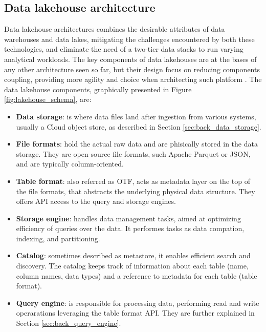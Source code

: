 \subsection{Data lakehouse architecture}
\label{subsec:datalakehouse_architecture}
Data lakehouse architectures combines the desirable attributes of data warehouses and data lakes, mitigating the challenges encountered by both these technologies, and eliminate the need of a two-tier data stacks to run varying analytical workloads. The key components of data lakehouses are at the bases of any other architecture seen so far, but their design focus on reducing components coupling, providing more agility and choice when architecting such platform \cite{mazumdarDataLakehouseData2023}. The data lakehouse components, graphically presented in Figure \ref{fig:lakehouse_schema}, are:

\begin{itemize}
    \item \textbf{Data storage}: is where data files land after ingestion from various systems, usually a Cloud object store, as described in Section \ref{sec:back_data_storage}.
    \item \textbf{File formats}: hold the actual raw data and are phisically stored in the data storage. They are open-source file formats, such Apache Parquet or JSON, and are typically column-oriented.
    \item \textbf{Table format}: also referred as \gls{OTF}, acts as metadata layer on the top of the file formats, that abstracts the underlying physical data structure. They offers \gls{API} access to the query and storage engines.
    \item \textbf{Storage engine}: handles data management tasks, aimed at optimizing efficiency of queries over the data. It performes tasks as data compation, indexing, and partitioning.
    \item \textbf{Catalog}: sometimes described as metastore, it enables efficient search and discovery. The catalog keeps track of information about each table (name, column names, data types) and a reference to metadata for each table (table format).
    \item \textbf{Query engine}: is responsible for processing data, performing read and write operarations leveraging the table format \gls{API}. They are further explained in Section \ref{sec:back_query_engine}.
\end{itemize}


